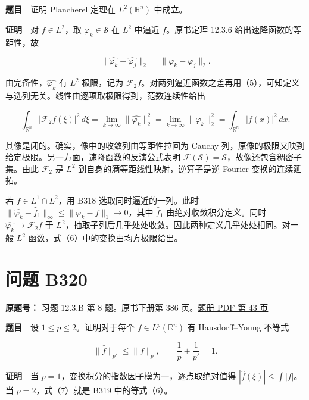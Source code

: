 \documentclass[11pt,a4paper]{article}
\begin{document}
\textbf{题目}　证明 Plancherel 定理在 \(L^2(\mathbb R^n)\) 中成立。

\textbf{证明}　对 \(f\in L^2\)，取 \(\varphi_k\in\mathcal S\) 在 \(L^2\)
中逼近 \(f\)。原书定理 12.3.6 给出速降函数的等距性，故

\begin{equation}
\|\widehat{\varphi_k}-\widehat{\varphi_j}\|_2
=\|\varphi_k-\varphi_j\|_2 .\tag{5}
\end{equation}

由完备性，\(\widehat{\varphi_k}\) 有 \(L^2\) 极限，记为
\(\mathcal F_2 f\)。对两列逼近函数之差再用（5），可知定义与选列无关。线性由逐项取极限得到，范数连续性给出

\begin{equation}
\int_{\mathbb R^n}|\mathcal F_2 f(\xi)|^2\,d\xi
=\lim_{k\to\infty}\|\widehat{\varphi_k}\|_2^2
=\lim_{k\to\infty}\|\varphi_k\|_2^2
=\int_{\mathbb R^n}|f(x)|^2\,dx .\tag{6}
\end{equation}

其像是闭的。确实，像中的收敛列由等距性拉回为 Cauchy
列，原像的极限又映到给定极限。另一方面，速降函数的反演公式表明
\(\mathcal F(\mathcal S)=\mathcal S\)，故像还包含稠密子集。由此
\(\mathcal F_2\) 是 \(L^2\) 到自身的满等距线性映射，逆算子是逆 Fourier
变换的连续延拓。

若 \(f\in L^1\cap L^2\)，用 B318 选取同时逼近的一列。此时
\(\|\widehat{\varphi_k}-\widehat f_{\!1}\|_\infty\leq\|\varphi_k-f\|_1\to0\)，其中
\(\widehat f_{\!1}\) 由绝对收敛积分定义。同时
\(\widehat{\varphi_k}\to\mathcal F_2 f\) 于
\(L^2\)，抽取子列后几乎处处收敛。因此两种定义几乎处处相同。对一般
\(L^2\) 函数，式（6）中的变换由均方极限给出。

\section{问题 B320}\label{ux95eeux9898-b320}

\textbf{原题号：} 习题 12.3.B 第 8 题。原书下册第 386
页。\href{https://zj139.github.io/math-notes/files/problems/楼分析习题-v2.pdf\#page=43}{题册
PDF 第 43 页}

\textbf{题目}　设 \(1\leq p\leq2\)。证明对于每个
\(f\in L^p(\mathbb R^n)\) 有 Hausdorff--Young 不等式

\begin{equation}
\|\widehat f\|_{p'}\leq\|f\|_p,
\qquad \frac{1}{p}+\frac{1}{p'}=1 .\tag{7}
\end{equation}

\textbf{证明}　当 \(p=1\)，变换积分的指数因子模为一，逐点取绝对值得
\(|\widehat f(\xi)|\leq\int|f|\)。当 \(p=2\)，式（7）就是 B319
中的等式（6）。
\end{document}

